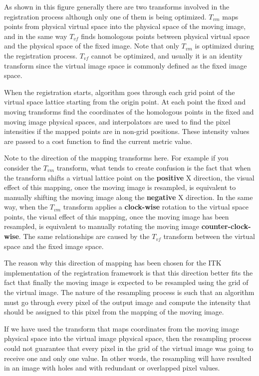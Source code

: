 As shown in this figure generally there are two transforms involved in the
registration process although only one of them is being optimized. $T_{vm}$
maps points from physical virtual space into the physical space of the moving
image, and in the same way $T_{vf}$ finds homologous points between physical
virtual space and the physical space of the fixed image. Note that only
$T_{vm}$ is optimized during the registration process. $T_{vf}$ cannot be
optimized, and usually it is an identity transform since the virtual image
space is commonly defined as the fixed image space.

When the registration starts, algorithm goes through each grid point of the
virtual space lattice starting from the origin point. At each point the fixed
and moving transforms find the coordinates of the homologous points in the fixed
and moving image physical spaces, and interpolators are used to find the pixel
intensities if the mapped points are in non-grid positions. These intensity values
are passed to a cost function to find the current metric value.

Note to the direction of the mapping transforms here. For example if you consider the
$T_{vm}$ transform, what tends to create confusion is the fact that when the transform
shifts a virtual lattice point on the \textbf{positive} X direction, the visual effect of this
mapping, once the moving image is resampled, is equivalent to manually shifting the moving
image along the \textbf{negative} X direction. In the same way, when the $T_{vm}$
transform applies a \textbf{clock-wise} rotation to the virtual space points, the visual effect of
this mapping, once the moving image has been resampled, is equivalent to manually rotating
the moving image \textbf{counter-clock-wise}. The same relationships are caused by the $T_{vf}$
transform between the virtual space and the fixed image space.

The reason why this direction of mapping has been chosen for the ITK implementation
of the registration framework is that this direction better fits the fact that
finally the moving image is expected to be resampled using the grid of the virtual
image. The nature of the resampling process is such that an algorithm must go through
every pixel of the output image and compute the intensity that should be assigned
to this pixel from the mapping of the moving image.

If we have used the transform that maps coordinates from the moving image physical
space into the virtual image physical space, then the resampling process could not
guarantee that every pixel in the grid of the virtual image was going to receive
one and only one value. In other words, the resampling will have resulted in an
image with holes and with redundant or overlapped pixel values.

